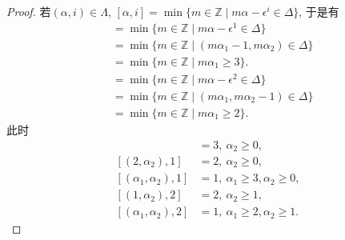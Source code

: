 \begin{proof}
若$(\alpha,i)\in \Lambda$, $[\alpha,i] = \min \{m\in \mathbb{Z}\mid m \alpha -\epsilon^i \in \Delta\}$, 于是有
\begin{align*}
[\alpha,1] & = \min \{m\in \mathbb{Z} \mid m \alpha -\epsilon^1 \in \Delta\} \\
& =\min \{m\in \mathbb{Z} \mid (m \alpha_1-1,m \alpha_2)\in \Delta\} \\
& =\min \{m\in \mathbb{Z} \mid m \alpha_1\geq 3\}.
\end{align*}
\begin{align*}
[\alpha,2] & = \min \{m\in \mathbb{Z} \mid m \alpha -\epsilon^2 \in \Delta\} \\
& =\min \{m\in \mathbb{Z} \mid (m \alpha_1,m \alpha_2-1)\in \Delta\} \\
& =\min \{m\in \mathbb{Z} \mid m \alpha_1\geq 2\}.
\end{align*}
此时
\begin{align*}
[(1,\alpha_2),1] & = 3, \ \alpha_2\geq 0, \\
[(2,\alpha_2),1] & = 2, \ \alpha_2\geq 0, \\
[(\alpha_1,\alpha_2),1] & = 1, \ \alpha_1\geq 3, \alpha_2\geq 0, \\
[(1,\alpha_2),2] & = 2, \ \alpha_2\geq 1, \\
[(\alpha_1,\alpha_2),2] & = 1, \ \alpha_1\geq 2, \alpha_2\geq 1.
\end{align*}





\end{proof}
